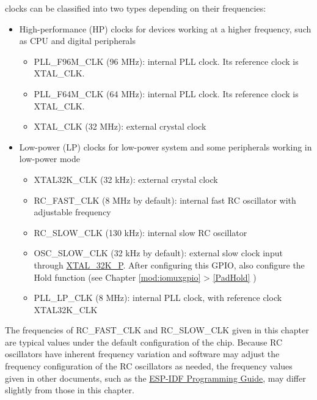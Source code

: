 \documentclass[main\_\_EN.tex]{subfiles}
\begin{document}
\chipname{} clocks can be classified into two types depending on their frequencies:
\begin{itemize}
    \item High-performance (HP) clocks for devices working at a higher frequency, such as CPU and digital peripherals
    \begin{itemize}
        \item PLL\_F96M\_CLK (96 MHz): internal PLL clock. Its reference clock is XTAL\_CLK.
        \item PLL\_F64M\_CLK (64 MHz): internal PLL clock. Its reference clock is XTAL\_CLK.
        \item XTAL\_CLK (32 MHz): external crystal clock
    \end{itemize}
    \item Low-power (LP) clocks for low-power system and some peripherals working in low-power mode
    \begin{itemize}
        \item XTAL32K\_CLK (32 kHz): external crystal clock
	    \item RC\_FAST\_CLK (8 MHz by default): internal fast RC oscillator with adjustable frequency
	    \item RC\_SLOW\_CLK (130 kHz): internal slow RC oscillator
	    \item OSC\_SLOW\_CLK (32 kHz by default): external slow clock input through \hyperref[tab:iomuxgpio-iomax-pins-analog-functions]{XTAL\_32K\_P}. After configuring this GPIO, also configure the Hold function (see Chapter \ref{mod:iomuxgpio} \textit{} >  \ref{PadHold} \textit{})
        \item PLL\_LP\_CLK (8 MHz):  internal PLL clock, with reference clock XTAL32K\_CLK
    \end{itemize}
\end{itemize}

\begin{tiplisting}
The frequencies of RC\_FAST\_CLK and RC\_SLOW\_CLK given in this chapter are typical values under the default configuration of the chip. Because RC oscillators have inherent frequency variation and software may adjust the frequency configuration of the RC oscillators as needed, the frequency values given in other documents, such as the \href{https://docs.espressif.com/projects/esp-idf/en/latest/esp32h2/api-reference/peripherals/clk_tree.html}{ESP-IDF Programming Guide}, may differ slightly from those in this chapter.
\end{tiplisting}
\end{document}
